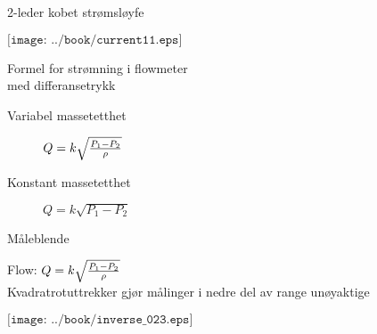 \documentclass[avery5371,grid,frame]{flashcards}
\begin{document}


\begin{flashcard}{2-leder kobet strømsløyfe}

$\texttt{[image: ../book/current11.eps]}$
\end{flashcard}

\begin{flashcard}{Formel for strømning i flowmeter \\ med differansetrykk}

  \begin{description}
    \item [Variabel massetetthet] $Q = k \sqrt{{P_1 - P_2} \over \rho}$ 
    \item [Konstant massetetthet] $Q = k \sqrt{P_1 - P_2 }$ 
  \end{description}


\end{flashcard}

\begin{flashcard}{Måleblende}
	\begin{minipage}{0.35\textwidth}
	Flow: $Q = k \sqrt{{P_1 - P_2} \over \rho}$ 
	\\
	Kvadratrotuttrekker gjør målinger i nedre del av range unøyaktige
	\end{minipage}
	\begin{minipage}{0.65\textwidth}
$\texttt{[image: ../book/inverse\_023.eps]}$
	\end{minipage}


\end{flashcard}
\end{document}

